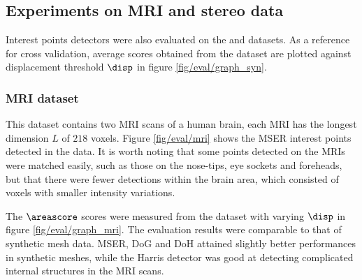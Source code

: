 \subsection{Experiments on MRI and stereo data}

Interest points detectors were also evaluated on the \mriset and \stereoset datasets. As a reference for cross validation, average scores obtained from the \meshset dataset are plotted against displacement threshold $\disp$ in figure \ref{fig/eval/graph_syn}. 

\subsubsection{MRI dataset} This dataset contains two MRI scans of a human brain, each MRI has the longest dimension $L$ of $218$ voxels.
Figure \ref{fig/eval/mri} shows the MSER interest points detected in the data. It is worth noting that some points detected on the MRIs were matched easily, such as those on the nose-tips, eye sockets and foreheads, but that there were fewer detections within the brain area, which consisted of voxels with smaller intensity variations.

The $\areascore$ scores were measured from the \mriset dataset with varying $\disp$ in figure \ref{fig/eval/graph_mri}. The evaluation results were comparable to that of synthetic mesh data. MSER, DoG and DoH attained slightly better performances in synthetic meshes, while the Harris detector was good at detecting complicated internal structures in the MRI scans. 

